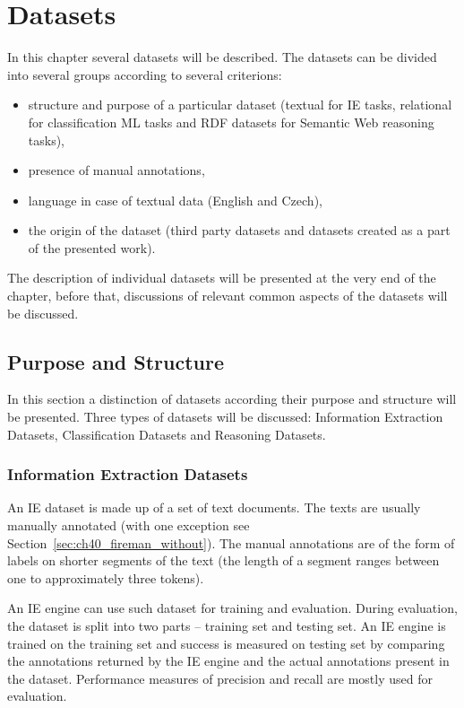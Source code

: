 \chapter{Datasets} \label{sec:ch_data}

\graphicspath{{../img/ch40/}}



In this chapter several datasets will be described. The datasets can be divided into several groups according to several criterions: 
\begin{itemize}
	\item structure and purpose of a particular dataset (textual for IE tasks, relational for classification ML tasks and RDF datasets for Semantic Web reasoning tasks), 
	\item presence of manual annotations,
	\item language in case of textual data (English and Czech), 
	\item the origin of the dataset (third party datasets and datasets created as a part of the presented work).
\end{itemize}
The description of individual datasets will be presented at the very end of the chapter, before that, discussions of relevant common aspects of the datasets will be discussed.


\section{Purpose and Structure}
In this section a distinction of datasets according their purpose and structure will be presented. Three types of datasets will be discussed: Information Extraction Datasets, Classification Datasets and Reasoning Datasets.

\subsection{Information Extraction Datasets}
An IE dataset is made up of a set of text documents. The texts are usually manually annotated (with one exception see Section~\ref{sec:ch40_fireman_without}). The manual annotations are of the form of labels on shorter segments of the text (the length of a segment ranges between one to approximately three tokens). 

An IE engine can use such dataset for training and evaluation. During evaluation, the dataset is split into two parts -- training set and testing set. An IE engine is trained on the training set and success is measured on testing set by comparing the annotations returned by the IE engine and the actual annotations present in the dataset.
Performance measures of precision and recall are mostly used for evaluation. 

